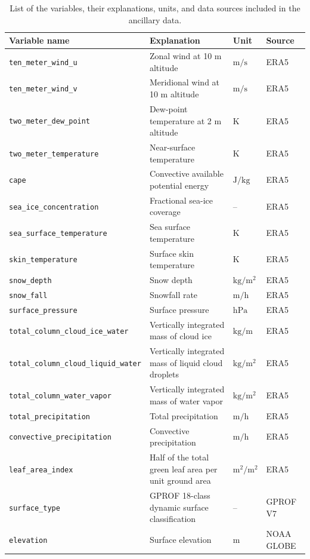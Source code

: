 \documentclass[11pt]{article}
\begin{document}
\begin{table}[htbp]
\centering
\begin{tabular}{lp{4cm}ll}
\toprule
\textbf{Variable name} & \textbf{Explanation} & \textbf{Unit} & \textbf{Source} \\
\midrule
\texttt{ten\_meter\_wind\_u} & Zonal wind at 10 m altitude & $\si{\meter \per \second}$ & ERA5 \\
\texttt{ten\_meter\_wind\_v} & Meridional wind at 10 m altitude & $\si{\meter \per \second}$ & ERA5 \\
\texttt{two\_meter\_dew\_point} & Dew-point temperature at 2 m altitude & $\si{\kelvin}$ & ERA5 \\
\texttt{two\_meter\_temperature} & Near-surface temperature & $\si{\kelvin}$ & ERA5 \\
\texttt{cape} & Convective available potential energy & $\si{\joule \per \kilo \gram}$ & ERA5 \\
\texttt{sea\_ice\_concentration} & Fractional sea-ice coverage & -- & ERA5 \\
\texttt{sea\_surface\_temperature} & Sea surface temperature & $\si{\kelvin}$ & ERA5 \\
\texttt{skin\_temperature} & Surface skin temperature & $\si{\kelvin}$ & ERA5 \\
\texttt{snow\_depth} & Snow depth & $\si{\kilo \gram \per \meter \squared}$ & ERA5 \\
\texttt{snow\_fall} & Snowfall rate & $\si{\meter \per \hour}$ & ERA5 \\
\texttt{surface\_pressure} & Surface pressure & $\si{\hecto \pascal}$ & ERA5 \\
\texttt{total\_column\_cloud\_ice\_water} & Vertically integrated mass of cloud ice & $\si{\kilo \gram \per \meter}$ & ERA5 \\
\texttt{total\_column\_cloud\_liquid\_water} & Vertically integrated mass of liquid cloud droplets & $\si{\kilo \gram \per \meter \squared}$ & ERA5 \\
\texttt{total\_column\_water\_vapor} & Vertically integrated mass of water vapor & $\si{\kilo \gram \per \meter \squared}$ & ERA5 \\
\texttt{total\_precipitation} & Total precipitation & $\si{\meter \per \hour}$ & ERA5 \\
\texttt{convective\_precipitation} & Convective precipitation & $\si{\meter \per \hour}$ & ERA5 \\
\texttt{leaf\_area\_index} & Half of the total green leaf area per unit ground area & $\si{\meter \squared \per \meter \squared}$ & ERA5 \\
\texttt{surface\_type} & GPROF 18-class dynamic surface classification & -- & GPROF V7 \\
\texttt{elevation} & Surface elevation & $\si{\meter}$ & NOAA GLOBE \\
\bottomrule
\end{tabular}
\caption{List of the variables, their explanations, units, and data sources included in the ancillary data.}
\label{tab:ancillary}
\end{table}
\end{document}
